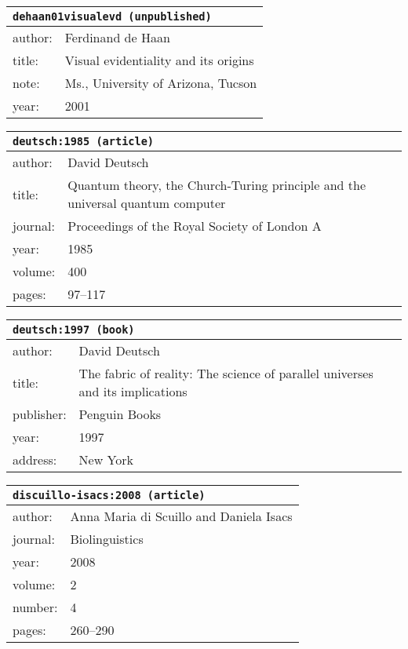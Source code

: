 \documentclass{article}
\begin{document}
\bigskip

\begin{tabular}{p{}p{}}
\multicolumn{2}{l}{\texttt{dehaan01visualevd (unpublished)}}\\
\hline
author: & Ferdinand {de Haan}\\
title: & Visual evidentiality and its origins\\
note: & \textsc{M}s., University of Arizona, Tucson\\
year: & 2001\\
\end{tabular}

\bigskip

\begin{tabular}{p{}p{}}
\multicolumn{2}{l}{\texttt{deutsch:1985 (article)}}\\
\hline
author: & David Deutsch\\
title: & Quantum theory, the Church-Turing principle and the universal quantum computer\\
journal: & Proceedings of the Royal Society of London A\\
year: & 1985\\
volume: & 400\\
pages: & 97--117\\
\end{tabular}

\bigskip

\begin{tabular}{p{}p{}}
\multicolumn{2}{l}{\texttt{deutsch:1997 (book)}}\\
\hline
author: & David Deutsch\\
title: & The fabric of reality: The science of parallel universes and its implications \\
publisher: & Penguin Books\\
year: & 1997\\
address: & New York\\
\end{tabular}

\bigskip

\begin{tabular}{p{}p{}}
\multicolumn{2}{l}{\texttt{discuillo-isacs:2008 (article)}}\\
\hline
author: & Anna Maria {di Scuillo} and Daniela Isacs\\
journal: & Biolinguistics\\
year: & 2008\\
volume: & 2\\
number: & 4\\
pages: & 260--290\\
\end{tabular}
\end{document}
